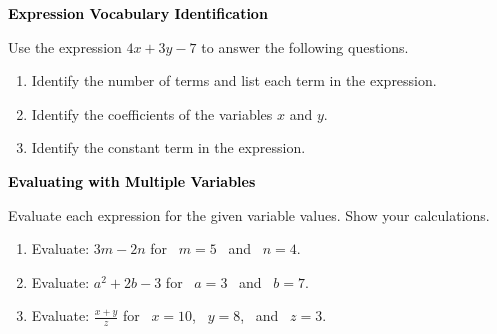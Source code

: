 \documentclass[12pt, letterpaper, fleqn]{article}
\begin{document}
\newpage

\begin{tcolorbox}[colback=black!10]
\large\textcolor{black}{\textbf{Expression Vocabulary Identification}}
\end{tcolorbox}

\noindent
Use the expression $4x + 3y - 7$ to answer the following questions.

\vspace{3mm}

\begin{enumerate}[itemsep=2.2cm, leftmargin=0.6cm]

\item Identify the number of terms and list each term in the expression.

\vspace{2cm}

\item Identify the coefficients of the variables $x$ and $y$.

\vspace{2cm}

\item Identify the constant term in the expression.

\vspace{2cm}

\end{enumerate}

\newpage

\begin{tcolorbox}[colback=black!10]
\large\textcolor{black}{\textbf{Evaluating with Multiple Variables}}
\end{tcolorbox}

\noindent
Evaluate each expression for the given variable values. Show your calculations.

\vspace{3mm}

\begin{enumerate}[itemsep=2.2cm, leftmargin=0.6cm]

\item Evaluate: $3m - 2n$ \quad for \ $m = 5$ \ and \ $n = 4$.

\vspace{2cm}

\item Evaluate: $a^2 + 2b - 3$ \quad for \ $a = 3$ \ and \ $b = 7$.

\vspace{2cm}

\item Evaluate: $\frac{x + y}{z}$ \quad for \ $x = 10$, \ $y = 8$, \ and \ $z = 3$.

\vspace{2cm}

\end{enumerate}
\end{document}
